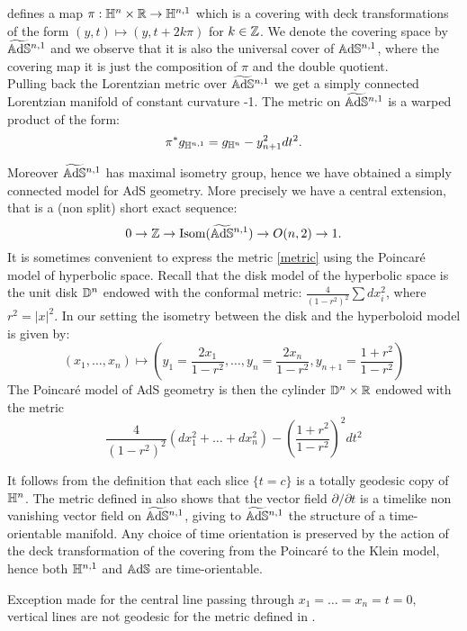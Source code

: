 defines a map $\pi:\mathbb{H}^n\times \mathbb{R}\to \mathbb{H}^{n,1}$ which is a covering with deck transformations of the form $(y,t)\mapsto (y,t+2k\pi)$ for $k\in \mathbb{Z}$. We denote the covering space by $\widetilde{\mathbb{A}\mathrm{d}\mathbb{S}}{}^{n,1}$ and we observe that it is also the universal cover of $\mathbb{A}\mathrm{d}\mathbb{S}^{n,1}$, where the covering map it is just the composition of $\pi$ and the double quotient.\\
Pulling back the Lorentzian metric over $\widetilde{\mathbb{A}\mathrm{d}\mathbb{S}}{}^{n,1}$ we get a simply connected Lorentzian manifold of constant curvature -1. The metric on $\widetilde{\mathbb{A}\mathrm{d}\mathbb{S}}{}^{n,1}$ is a warped product of the form: 
\begin{equation}\label{metric}
     \pi^*g_{\mathbb{H}^{n,1}}=g_{\mathbb{H}^n}-y_{n+1}^{2}dt^2.
\end{equation}
   

Moreover $\widetilde{\mathbb{A}\mathrm{d}\mathbb{S}}{}^{n,1}$ has maximal isometry group, hence we have obtained a simply connected model for AdS geometry. More precisely we have a central extension, that is a (non split) short exact sequence:
\[
    0\to \mathbb{Z}\to \textnormal{Isom}(\widetilde{\mathbb{A}\mathrm{d}\mathbb{S}}{}^{n,1})\to O(n,2)\to 1.
\]
It is sometimes convenient to express the metric \ref{metric} using the Poincaré model of hyperbolic space. Recall that the disk model of the hyperbolic space is the unit disk $\mathbb{D}^n$ endowed with the conformal metric: $\frac{4}{(1-r^2)^2}\sum dx_i^2$, where $r^2=\vert x\vert^2$. In our setting the isometry between the disk and the hyperboloid model is given by: 
\begin{equation}
    (x_1,\dots, x_n)\mapsto (y_1=\frac{2x_1}{1-r^2},\dots, y_n=\frac{2x_n}{1-r^2},y_{n+1}=\frac{1+r^2}{1-r^2}) 
\end{equation}
The Poincaré model of AdS geometry is then the cylinder $\mathbb{D}^n\times \mathbb{R}$ endowed with the metric 
\begin{equation}\label{metricdisk}
    \frac{4}{(1-r^2)^2}(dx_1^2+\dots+dx_n^2)-(\frac{1+r^2}{1-r^2})^{2}dt^2 
\end{equation}

It follows from the definition that each slice $\{t=c\}$ is a totally geodesic copy of $\mathbb{H}^n$. The metric defined in  also shows that the vector field $\partial/\partial t$ is a timelike non vanishing vector field on $\widetilde{\mathbb{A}\mathrm{d}\mathbb{S}}{}^{n,1}$, giving to $\widetilde{\mathbb{A}\mathrm{d}\mathbb{S}}{}^{n,1}$ the structure of a time-orientable manifold. Any choice of time orientation is preserved by the action of the deck transformation of the covering from the Poincaré to the Klein model, hence both $\mathbb{H}^{n,1}$ and $\mathbb{A}\mathrm{d}\mathbb{S}$ are time-orientable. \\
\begin{observation}
    Exception made for the central line passing through $x_1=\dots=x_n=t=0,$ vertical lines are not geodesic for the metric defined in .  
\end{observation}

